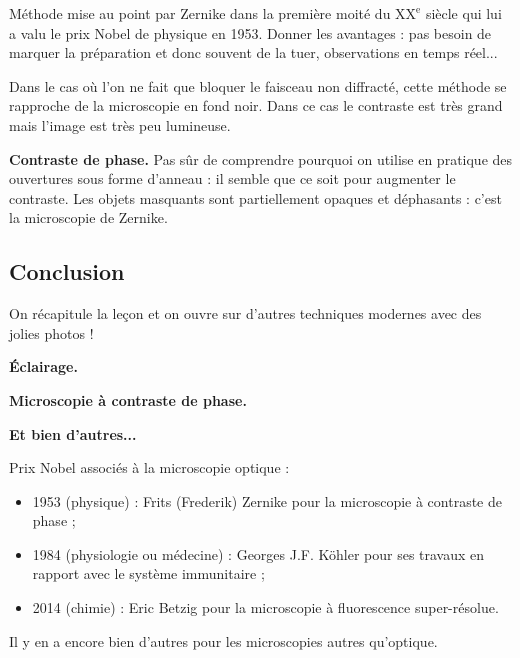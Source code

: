 Méthode mise au point par Zernike dans la première moité du $\mathrm{XX^e}$ siècle qui lui a valu le prix Nobel de physique en 1953.
Donner les avantages : pas besoin de marquer la préparation et donc souvent de la tuer, observations en temps réel...

\begin{remarque}
Dans le cas où l'on ne fait que bloquer le faisceau non diffracté, cette méthode se rapproche de la microscopie en fond noir.
Dans ce cas le contraste est très grand mais l'image est très peu lumineuse.
\end{remarque}

\begin{slide}
\textbf{Contraste de phase.}
Pas sûr de comprendre pourquoi on utilise en pratique des ouvertures sous forme d'anneau : il semble que ce soit pour augmenter le contraste.
Les objets masquants sont partiellement opaques et déphasants : c'est la microscopie de Zernike.
\end{slide}

\subsection*{Conclusion}

On récapitule la leçon et on ouvre sur d'autres techniques modernes avec des jolies photos !

\begin{slide}
\textbf{Éclairage.}
\end{slide}

\begin{slide}
\textbf{Microscopie à contraste de phase.}
\end{slide}

\begin{slide}
\textbf{Et bien d'autres...}
\end{slide}

\begin{funfact}
Prix Nobel associés à la microscopie optique :
\begin{itemize}
\item 1953 (physique) : Frits (Frederik) Zernike pour la microscopie à contraste de phase ;
\item 1984 (physiologie ou médecine) : Georges J.F. Köhler pour ses travaux en rapport avec le système immunitaire ;
\item 2014 (chimie) : Eric Betzig pour la microscopie à fluorescence super-résolue.
\end{itemize}
Il y en a encore bien d'autres pour les microscopies autres qu'optique.
\end{funfact}

